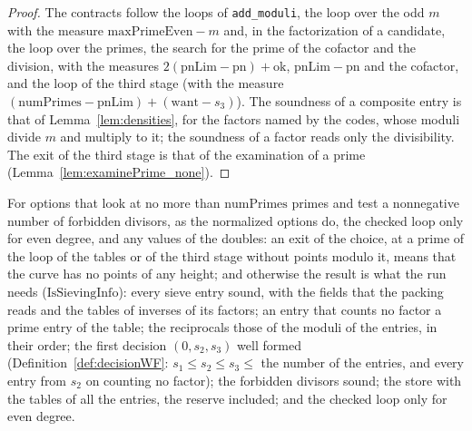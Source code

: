 \begin{proof}
  \leanok
  The contracts follow the loops of \verb|add_moduli|, the loop over the odd $m$ with the measure
  $\mathrm{maxPrimeEven} - m$ and, in the factorization of a candidate, the loop over the primes,
  the search for the prime of the cofactor and the division, with the measures
  $2(\mathrm{pnLim} - \mathrm{pn}) + \mathrm{ok}$, $\mathrm{pnLim} - \mathrm{pn}$ and the cofactor,
  and the loop of the third stage (with the measure
  $(\mathrm{numPrimes} - \mathrm{pnLim}) + (\mathrm{want} - s_3)$). The soundness of a composite
  entry is that of Lemma~\ref{lem:densities}, for the factors named by the codes, whose moduli
  divide $m$ and multiply to it; the soundness of a factor reads only the divisibility. The exit of
  the third stage is that of the examination of a prime (Lemma~\ref{lem:examinePrime_none}).
\end{proof}

\begin{lemma}\label{lem:choice}
  \leanok
  For options that look at no more than $\mathrm{numPrimes}$ primes and test a nonnegative number of
  forbidden divisors, as the normalized options do, the checked loop only for even degree, and any
  values of the doubles: an exit of the choice, at a prime of the loop of the tables or of the third
  stage without points modulo it, means that the curve has no points of any height; and otherwise
  the result is what the run needs ($\mathrm{IsSievingInfo}$): every sieve entry sound, with the
  fields that the packing reads and the tables of inverses of its factors; an entry that counts no
  factor a prime entry of the table; the reciprocals those of the moduli of the entries, in their
  order; the first decision $(0, s_2, s_3)$ well formed (Definition~\ref{def:decisionWF}:
  $s_1 \le s_2 \le s_3 \le$ the number of the entries, and every entry from $s_2$ on counting no
  factor); the forbidden divisors sound; the store with the tables of all the entries, the reserve
  included; and the checked loop only for even degree.
\end{lemma}

